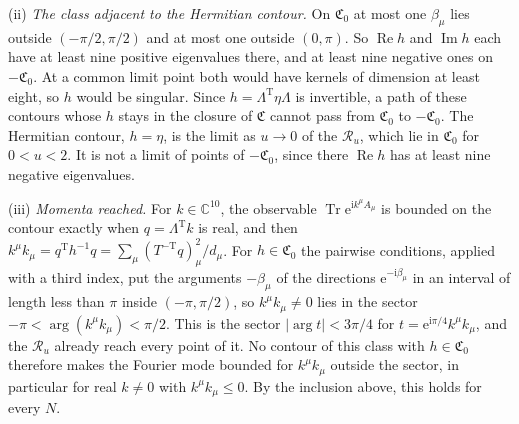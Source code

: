 (ii) \emph{The class adjacent to the Hermitian contour.} On \(\mathfrak C_0\) at most one \(\beta_\mu\) lies outside \((-\pi/2,\pi/2)\) and at most one outside \((0,\pi)\). So \(\operatorname{Re}h\) and \(\operatorname{Im}h\) each have at least nine positive eigenvalues there, and at least nine negative ones on \(-\mathfrak C_0\). At a common limit point both would have kernels of dimension at least eight, so \(h\) would be singular. Since \(h=\Lambda^{\mathrm T}\eta\Lambda\) is invertible, a path of these contours whose \(h\) stays in the closure of \(\mathfrak C\) cannot pass from \(\mathfrak C_0\) to \(-\mathfrak C_0\). The Hermitian contour, \(h=\eta\), is the limit as \(u\to0\) of the \(\mathcal R_u\), which lie in \(\mathfrak C_0\) for \(0<u<2\). It is not a limit of points of \(-\mathfrak C_0\), since there \(\operatorname{Re}h\) has at least nine negative eigenvalues.

(iii) \emph{Momenta reached.} For \(k\in\mathbb C^{10}\), the observable \(\operatorname{Tr}\mathrm e^{\mathrm ik^\mu A_\mu}\) is bounded on the contour exactly when \(q=\Lambda^{\mathrm T}k\) is real, and then \(k^\mu k_\mu=q^{\mathrm T}h^{-1}q=\sum_\mu(T^{-\mathrm T}q)_\mu^2/d_\mu\). For \(h\in\mathfrak C_0\) the pairwise conditions, applied with a third index, put the arguments \(-\beta_\mu\) of the directions \(\mathrm e^{-\mathrm i\beta_\mu}\) in an interval of length less than \(\pi\) inside \((-\pi,\pi/2)\), so \(k^\mu k_\mu\neq0\) lies in the sector \(-\pi<\arg(k^\mu k_\mu)<\pi/2\). This is the sector \(|\arg t|<3\pi/4\) for \(t=\mathrm e^{\mathrm i\pi/4}k^\mu k_\mu\), and the \(\mathcal R_u\) already reach every point of it. No contour of this class with \(h\in\mathfrak C_0\) therefore makes the Fourier mode bounded for \(k^\mu k_\mu\) outside the sector, in particular for real \(k\neq0\) with \(k^\mu k_\mu\le0\). By the inclusion above, this holds for every \(N\).

